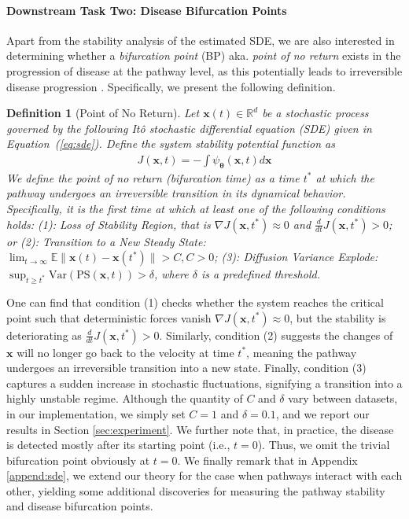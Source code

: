 \documentclass{article} %
\newtheorem{defn}{Definition} %
\begin{document}
\paragraph{Downstream Task Two: Disease Bifurcation Points}
Apart from the stability analysis of the estimated SDE, we are also interested in determining whether a \textit{bifurcation point} (BP) aka. \textit{point of no return} exists in the progression of disease at the pathway level, as this potentially leads to irreversible disease progression \citep{flores2023bifurcation}. Specifically, we present the following definition. 
\begin{defn}[Point of No Return]\label{defn:BP}
    Let $\mathbf x(t) \in \mathbb R^d$ be a stochastic process governed by the following Itô stochastic differential equation (SDE) given in Equation~(\ref{eq:sde}). Define the system stability potential function as 
    \begin{align}
        J(\mathbf x, t) = - \int \psi_{\boldsymbol{\theta}} (\mathbf x, t) d\mathbf x 
    \end{align}
   We define the point of no return (bifurcation time) as a time $t^*$
  at which the pathway undergoes an irreversible transition in its dynamical behavior. Specifically, it is the first time at which at least one of the following conditions holds: (1): \textit{Loss of Stability Region}, that is $\nabla J(\mathbf x, t^*) \approx 0$ and $\frac{d}{dt}J(\mathbf x, t^*) >0$; or (2): \textit{Transition to a New Steady State}: $\lim_{t \rightarrow \infty} \mathbb E\|\mathbf x(t) - \mathbf x(t^*)\| > C, C>0$; (3): \textit{Diffusion Variance Explode}: $\sup_{t \geq t^*} \mathrm{Var}(\mathrm{PS}(\mathbf x, t)) > \delta$, where $\delta$ is a predefined threshold.   
\end{defn}
One can find that condition (1) checks whether the system reaches the critical point such that deterministic forces vanish $\nabla J(\mathbf x, t^*) \approx 0$, but the stability is deteriorating as $\frac{d}{dt}J(\mathbf x, t^*) >0$. Similarly, condition (2) suggests the changes of $\mathbf x$ will no longer go back to the velocity at time $t^*$, meaning the pathway undergoes an irreversible transition into a new state. Finally, condition (3) captures a sudden increase in stochastic fluctuations, signifying a transition into a highly unstable regime. Although the quantity of $C$ and $\delta$ vary between datasets, in our implementation, we simply set $C =1$ and $\delta = 0.1$, and we report our results in Section \ref{sec:experiment}. We further note that, in practice, the disease is detected mostly after its starting point (i.e., $t = 0$). Thus, we omit the trivial bifurcation point obviously at $t= 0$. We finally remark that in Appendix \ref{append:sde}, we extend our theory for the case when pathways interact with each other, yielding some additional discoveries for measuring the pathway stability and disease bifurcation points. 
\end{document}
